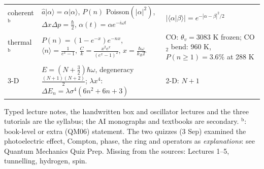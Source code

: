 \documentclass[9pt]{article}
\begin{document}
\begin{tabular}{@{}p{2.8cm}p{8.3cm}p{6.3cm}@{}}
coherent$^{\text{b}}$ & $\hat a|\alpha\rangle=\alpha|\alpha\rangle$, $P(n)$ Poisson$(|\alpha|^2)$, $\Delta x\Delta p=\tfrac\hbar2$, $\alpha(t)=\alpha e^{-i\omega t}$ & $|\langle\alpha|\beta\rangle|=e^{-|\alpha-\beta|^2/2}$\\
thermal$^{\text{b}}$ & $P(n)=(1{-}e^{-x})e^{-nx}$, $\langle n\rangle=\tfrac1{e^x-1}$, $\tfrac Ck=\tfrac{x^2e^x}{(e^x-1)^2}$, $x=\tfrac{\hbar\omega}{k_BT}$ & CO: $\theta_v=3083$ K frozen; CO$_2$ bend: 960 K, $P(n{\ge}1)=3.6\%$ at 288 K\\
3-D & $E=(N+\tfrac32)\hbar\omega$, degeneracy $\tfrac{(N+1)(N+2)}2$; $\lambda x^4$: $\Delta E_n=\lambda\sigma^4(6n^2{+}6n{+}3)$ & 2-D: $N+1$\\
\bottomrule
\end{tabular}

\vspace{4pt}
\begin{keybox}
Typed lecture notes, the handwritten box and oscillator lectures and the three tutorials are the syllabus; the AI monographs and textbooks are secondary. $^{\text{b}}$: book-level or extra (QM06) statement. The two quizzes (3 Sep) examined the photoelectric effect, Compton, phase, the ring and operators as \emph{explanations}: see Quantum Mechanics Quiz Prep. Missing from the sources: Lectures 1--5, tunnelling, hydrogen, spin.
\end{keybox}
\end{document}
